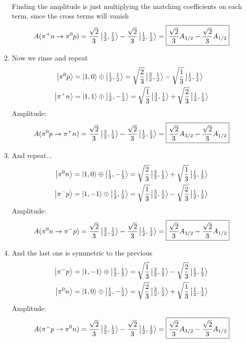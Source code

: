 \documentclass[12pt]{article}
\newcommand{\ppls}{\ket{1,1}}
\newcommand{\pzro}{\ket{1,0}}
\newcommand{\pmin}{\ket{1,-1}}
\newcommand{\prot}{\ket{\tfrac{1}{2}, \tfrac{1}{2}}}
\newcommand{\neut}{\ket{\tfrac{1}{2},-\tfrac{1}{2}}}
\newcommand{\ath}{\ket{\tfrac{3}{2},\tfrac{1}{2}}}
\newcommand{\aoh}{\ket{\tfrac{1}{2},\tfrac{1}{2}}}
\begin{document}
\begin{enumerate}[label=\alph*.)]
\begin{align*}
  \end{align*}
  Finding the amplitude is just multiplying the matching coefficients on each term, since the cross terms will vanish
  \begin{align*}
    A(\pi^+n\to\pi^0p)=\frac{\sqrt{2}}{3}\ath-\frac{\sqrt{2}}{3}\aoh
    =\boxed{\frac{\sqrt{2}}{3}A_{3/2}-\frac{\sqrt{2}}{3}A_{1/2}}
  \end{align*}
\item Now we rinse and repeat
    \begin{align*}
    \ket{\pi^0p}&=\pzro\oplus\prot=\sqrt{\frac{2}{3}}\ath-\sqrt{\frac{1}{3}}\aoh\\
    \ket{\pi^+n}&=\ppls\oplus\neut=\sqrt{\frac{1}{3}}\ath+\sqrt{\frac{2}{3}}\aoh
  \end{align*}
  Amplitude:
  \begin{align*}
    A(\pi^0p\to\pi^+n)=\frac{\sqrt{2}}{3}\ath-\frac{\sqrt{2}}{3}\aoh
    =\boxed{\frac{\sqrt{2}}{3}A_{3/2}-\frac{\sqrt{2}}{3}A_{1/2}}
  \end{align*}
\item And repeat...
    \begin{align*}
    \ket{\pi^0n}&=\pzro\oplus\neut=\sqrt{\frac{2}{3}}\ath+\sqrt{\frac{1}{3}}\aoh\\
    \ket{\pi^-p}&=\pmin\oplus\prot=\sqrt{\frac{1}{3}}\ath-\sqrt{\frac{2}{3}}\aoh
  \end{align*}
  Amplitude:
  \begin{align*}
    A(\pi^0n\to\pi^-p)=\frac{\sqrt{2}}{3}\ath-\frac{\sqrt{2}}{3}\aoh
    =\boxed{\frac{\sqrt{2}}{3}A_{3/2}-\frac{\sqrt{2}}{3}A_{1/2}}
  \end{align*}
\item And the last one is symmetric to the previous
    \begin{align*}
    \ket{\pi^-p}&=\pmin\oplus\prot=\sqrt{\frac{1}{3}}\ath-\sqrt{\frac{2}{3}}\aoh\\
    \ket{\pi^0n}&=\pzro\oplus\neut=\sqrt{\frac{2}{3}}\ath+\sqrt{\frac{1}{3}}\aoh
  \end{align*}
  Amplitude:
  \begin{align*}
    A(\pi^-p\to\pi^0n)=\frac{\sqrt{2}}{3}\ath-\frac{\sqrt{2}}{3}\aoh
    =\boxed{\frac{\sqrt{2}}{3}A_{3/2}-\frac{\sqrt{2}}{3}A_{1/2}}
  \end{align*}
\end{enumerate}
\end{document}
